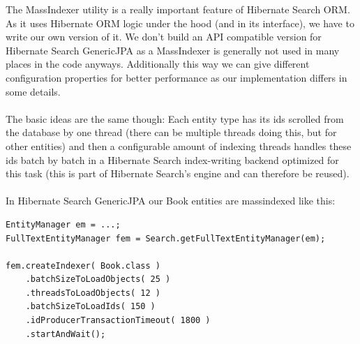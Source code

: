 The MassIndexer utility is a really important feature of Hibernate Search ORM. As it uses Hibernate ORM logic under the hood (and in its interface), we have to write our own version of it. We don't build an API compatible version for Hibernate Search GenericJPA as a MassIndexer is generally not used in many places in the code anyways. Additionally this way we can give different configuration properties for better performance as our implementation differs in some details.
\\\\
The basic ideas are the same though: Each entity type has its ids scrolled from the database by one thread (there can be multiple threads doing this, but for other entities) and then a configurable amount of indexing threads handles these ids batch by batch in a Hibernate Search index-writing backend optimized for this task (this is part of Hibernate Search's engine and can therefore be reused).
\\\\
In Hibernate Search GenericJPA our Book entities are massindexed like this:
\\
\lstset{language=java}
\begin{lstlisting}[frame=htrbl, caption={MassIndexer usage with Hibernate Search ORM}, label={lst:massindexing_hsearch_orm.java}]
EntityManager em = ...;
FullTextEntityManager fem = Search.getFullTextEntityManager(em);

fem.createIndexer( Book.class )
	.batchSizeToLoadObjects( 25 )
	.threadsToLoadObjects( 12 )
	.batchSizeToLoadIds( 150 )
	.idProducerTransactionTimeout( 1800 )
	.startAndWait();
\end{lstlisting}

\pagebreak